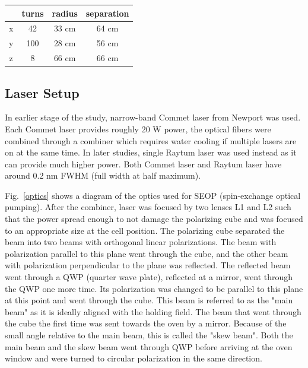 \begin{center}
	\begin{tabular}{ | c | c| c| c | }
		\hline
		& turns & radius & separation \\ \hline
		x & 42 & 33 cm & 64 cm \\ \hline 
		y & 100 & 28 cm & 56 cm \\ \hline
		z & 8 & 66 cm & 66 cm \\
		\hline
	\end{tabular}
\end{center}\label{gradient_coils_table}

\subsection{Laser Setup}

In earlier stage of the study, narrow-band Commet laser from Newport was used. Each Commet laser provides roughly 20 W power, the optical fibers were combined through a combiner which requires water cooling if multiple lasers are on at the same time. In later studies, single Raytum laser was used instead as it can provide much higher power. Both Commet laser and Raytum laser have around 0.2 nm FWHM (full width at half maximum).

Fig.~\ref{optics} shows a diagram of the optics used for SEOP (spin-exchange optical pumping). After the combiner, laser was focused by two lenses L1 and L2 such that the power spread enough to not damage the polarizing cube and was focused to an appropriate size at the cell position. The polarizing cube separated the beam into two beams with orthogonal linear polarizations. The beam with polarization parallel to this plane went through the cube, and the other beam with polarization perpendicular to the plane was reflected. The reflected beam went through a QWP (quarter wave plate), reflected at a mirror, went through the QWP one more time. Its polarization was changed to be parallel to this plane at this point and went through the cube. This beam is referred to as the "main beam" as it is ideally aligned with the holding field. The beam that went through the cube the first time was sent towards the oven by a mirror. Because of the small angle relative to the main beam, this is called the "skew beam". Both the main beam and the skew beam went through QWP before arriving at the oven window and were turned to circular polarization in the same direction.

